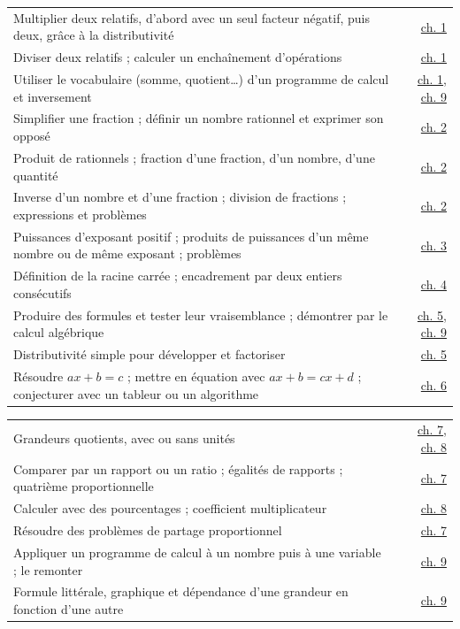\begin{tabularx}{\linewidth}{@{}Yr@{}}\toprule
Multiplier deux relatifs, d’abord avec un seul facteur négatif, puis deux, grâce à la distributivité & \hyperref[chap-1]{ch. 1}\\[1.2mm]
Diviser deux relatifs ; calculer un enchaînement d’opérations & \hyperref[chap-1]{ch. 1}\\[1.2mm]
Utiliser le vocabulaire (somme, quotient\ldots) d’un programme de calcul et inversement & \hyperref[chap-1]{ch. 1}, \hyperref[chap-9]{ch. 9}\\[1.2mm]
Simplifier une fraction ; définir un nombre rationnel et exprimer son opposé & \hyperref[chap-2]{ch. 2}\\[1.2mm]
Produit de rationnels ; fraction d’une fraction, d’un nombre, d’une quantité & \hyperref[chap-2]{ch. 2}\\[1.2mm]
Inverse d’un nombre et d’une fraction ; division de fractions ; expressions et problèmes & \hyperref[chap-2]{ch. 2}\\[1.2mm]
Puissances d’exposant positif ; produits de puissances d’un même nombre ou de même exposant ; problèmes & \hyperref[chap-3]{ch. 3}\\[1.2mm]
Définition de la racine carrée ; encadrement par deux entiers consécutifs & \hyperref[chap-4]{ch. 4}\\[1.2mm]
Produire des formules et tester leur vraisemblance ; démontrer par le calcul algébrique & \hyperref[chap-5]{ch. 5}, \hyperref[chap-9]{ch. 9}\\[1.2mm]
Distributivité simple pour développer et factoriser & \hyperref[chap-5]{ch. 5}\\[1.2mm]
Résoudre $ax+b=c$ ; mettre en équation avec $ax+b=cx+d$ ; conjecturer avec un tableur ou un algorithme & \hyperref[chap-6]{ch. 6}\\[1.2mm]
\bottomrule\end{tabularx}\par\vspace{3mm}
\begin{tabularx}{\linewidth}{@{}Yr@{}}\toprule
Grandeurs quotients, avec ou sans unités & \hyperref[chap-7]{ch. 7}, \hyperref[chap-8]{ch. 8}\\[1.2mm]
Comparer par un rapport ou un ratio ; égalités de rapports ; quatrième proportionnelle & \hyperref[chap-7]{ch. 7}\\[1.2mm]
Calculer avec des pourcentages ; coefficient multiplicateur & \hyperref[chap-8]{ch. 8}\\[1.2mm]
Résoudre des problèmes de partage proportionnel & \hyperref[chap-7]{ch. 7}\\[1.2mm]
Appliquer un programme de calcul à un nombre puis à une variable ; le remonter & \hyperref[chap-9]{ch. 9}\\[1.2mm]
Formule littérale, graphique et dépendance d’une grandeur en fonction d’une autre & \hyperref[chap-9]{ch. 9}\\[1.2mm]
\bottomrule\end{tabularx}\par\vspace{3mm}

